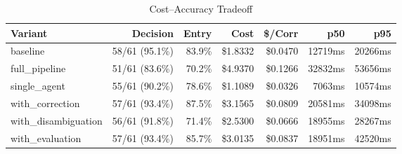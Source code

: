 \begin{table}[htbp]
\centering
\caption{Cost--Accuracy Tradeoff}
\label{tab:cost-accuracy}
\begin{tabular}{l r r rr rr}
\toprule
Variant & Decision & Entry & Cost & \$/Corr & p50 & p95 \\
\midrule
  baseline & 58/61 (95.1\%) & 83.9\% & \$1.8332 & \$0.0470 & 12719ms & 20266ms \\
  full\_pipeline & 51/61 (83.6\%) & 70.2\% & \$4.9370 & \$0.1266 & 32832ms & 53656ms \\
  single\_agent & 55/61 (90.2\%) & 78.6\% & \$1.1089 & \$0.0326 & 7063ms & 10574ms \\
  with\_correction & 57/61 (93.4\%) & 87.5\% & \$3.1565 & \$0.0809 & 20581ms & 34098ms \\
  with\_disambiguation & 56/61 (91.8\%) & 71.4\% & \$2.5300 & \$0.0666 & 18955ms & 28267ms \\
  with\_evaluation & 57/61 (93.4\%) & 85.7\% & \$3.0135 & \$0.0837 & 18951ms & 42520ms \\
\bottomrule
\end{tabular}
\end{table}

